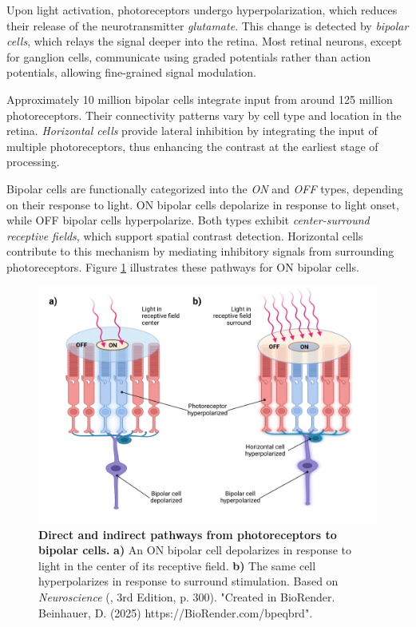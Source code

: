 Upon light activation, photoreceptors undergo hyperpolarization, which reduces their release of the neurotransmitter \emph{glutamate}. This change is detected by \emph{bipolar cells}, which relays the signal deeper into the retina. Most retinal neurons, except for ganglion cells, communicate using graded potentials rather than action potentials, allowing fine-grained signal modulation.

Approximately 10 million bipolar cells integrate input from around 125 million photoreceptors. Their connectivity patterns vary by cell type and location in the retina. \emph{Horizontal cells} provide lateral inhibition by integrating the input of multiple photoreceptors, thus enhancing the contrast at the earliest stage of processing.

Bipolar cells are functionally categorized into the \emph{ON} and \emph{OFF} types, depending on their response to light. ON bipolar cells depolarize in response to light onset, while OFF bipolar cells hyperpolarize. Both types exhibit \emph{center-surround receptive fields}, which support spatial contrast detection. Horizontal cells contribute to this mechanism by mediating inhibitory signals from surrounding photoreceptors. Figure \ref{fig:on_off_cells} illustrates these pathways for ON bipolar cells.

\begin{figure}
    \centering
    \includegraphics[width=\linewidth]{img/on_off_cells.pdf}
    \caption{\textbf{Direct and indirect pathways from photoreceptors to bipolar cells.} \textbf{a)} An ON bipolar cell depolarizes in response to light in the center of its receptive field. \textbf{b)} The same cell hyperpolarizes in response to surround stimulation. Based on \emph{Neuroscience} (\citet{bear2020neuroscience}, 3rd Edition, p. 300). "Created in BioRender. Beinhauer, D. (2025) https://BioRender.com/bpeqbrd".}
    \label{fig:on_off_cells}
\end{figure}

